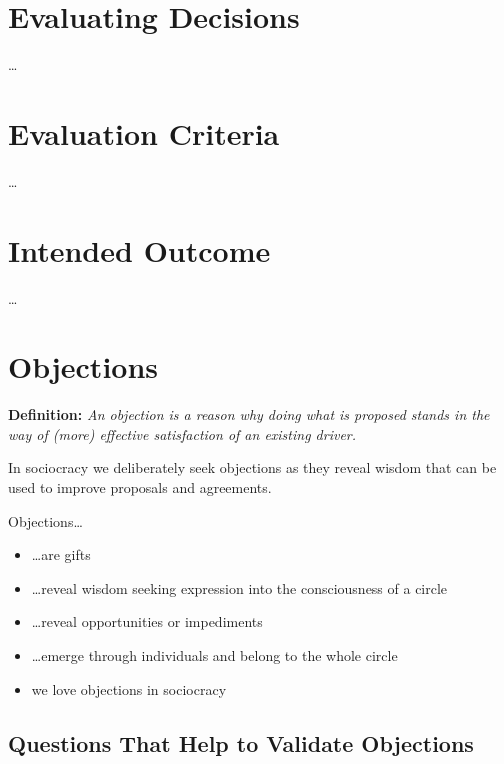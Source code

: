\section{Evaluating Decisions}
\label{evaluatingdecisions}

{\ldots}

\section{Evaluation Criteria}
\label{evaluationcriteria}

{\ldots}

\section{Intended Outcome}
\label{intendedoutcome}

{\ldots}

\section{Objections}
\label{objections}

\textbf{Definition:} \emph{An objection is a reason why doing what is proposed stands in the way of (more) effective satisfaction of an existing driver.}

In sociocracy we deliberately seek objections as they reveal
wisdom that can be used to improve proposals and agreements.

Objections{\ldots}

\begin{itemize}
\item {\ldots}are gifts

\item {\ldots}reveal wisdom seeking expression into the consciousness of a circle

\item {\ldots}reveal opportunities or impediments

\item {\ldots}emerge through individuals and belong to the whole circle

\item we love objections in sociocracy

\end{itemize}

\subsection{Questions That Help to Validate Objections}
\label{questionsthathelptovalidateobjections}

